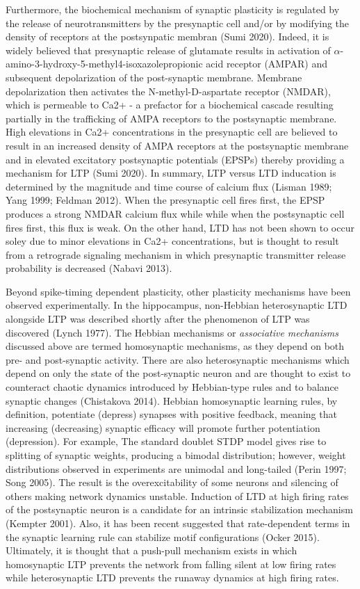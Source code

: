 \documentclass{ucetd}
\begin{document}
Furthermore, the biochemical mechanism of synaptic plasticity is regulated by the release of neurotransmitters by the presynaptic cell and/or by modifying the density of receptors at the postsynpatic membran (Sumi 2020). Indeed, it is widely believed that presynaptic release of glutamate results in activation of $\alpha$-amino-3-hydroxy-5-methyl4-isoxazolepropionic acid receptor (AMPAR) and subsequent depolarization of the post-synaptic membrane. Membrane depolarization then activates the N-methyl-D-aspartate receptor (NMDAR), which is permeable to Ca2+ - a prefactor for a biochemical cascade resulting partially in the trafficking of AMPA receptors to the postsynaptic membrane. High elevations in Ca2+ concentrations in the presynaptic cell are believed to result in an increased density of AMPA receptors at the postsynaptic membrane and in elevated excitatory postsynaptic potentials (EPSPs) thereby providing a mechanism for LTP (Sumi 2020). In summary, LTP versus LTD inducation is determined by the magnitude and time course of calcium flux (Lisman 1989; Yang 1999; Feldman 2012). When the presynaptic cell fires first, the EPSP produces a strong NMDAR calcium flux while while when the postsynaptic cell fires first, this flux is weak. On the other hand, LTD has not been shown to occur soley due to minor elevations in Ca2+ concentrations, but is thought to result from a retrograde signaling mechanism in which presynaptic transmitter release probability is decreased (Nabavi 2013).

Beyond spike-timing dependent plasticity, other plasticity mechanisms have been observed experimentally. In the hippocampus, non-Hebbian heterosynaptic LTD alongside LTP was described shortly after the phenomenon of LTP was discovered (Lynch 1977). The Hebbian mechanisms or \emph{associative mechanisms} discussed above are termed homosynaptic mechanisms, as they depend on both pre- and post-synaptic activity. There are also heterosynaptic mechanisms which depend on only the state of the post-synaptic neuron and are thought to exist to counteract chaotic dynamics introduced by Hebbian-type rules and to balance synaptic changes (Chistakova 2014). Hebbian homosynaptic learning rules, by definition, potentiate (depress) synapses with positive feedback, meaning that increasing (decreasing) synaptic efficacy will promote further potentiation (depression). For example, The standard doublet STDP model gives rise to splitting of synaptic weights, producing a bimodal distribution; however, weight distributions observed in experiments are unimodal and long-tailed (Perin 1997; Song 2005). The result is the overexcitability of some neurons and silencing of others making network dynamics unstable. Induction of LTD at high firing rates of the postsynaptic neuron is a candidate for an intrinsic stabilization mechanism (Kempter 2001). Also, it has been recent suggested that rate-dependent terms in the synaptic learning rule can stabilize motif configurations (Ocker 2015). Ultimately, it is thought that a push-pull mechanism exists in which homosynaptic LTP prevents the network from falling silent at low firing rates while heterosynaptic LTD prevents the runaway dynamics at high firing rates.
\end{document}
